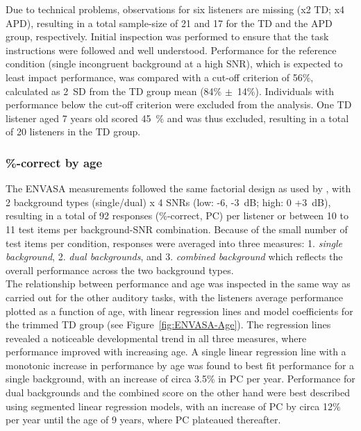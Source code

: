 \documentclass[a4paper, twoside]{templates/ociamthesis}
\begin{document}
Due to technical problems, observations for six listeners are missing (x2 TD; x4 APD), resulting in a total sample-size of 21 and 17 for the TD and the APD group, respectively. Initial inspection was performed to ensure that the task instructions were followed and well understood. Performance for the reference condition (single incongruent background at a high SNR), which is expected to least impact performance, was compared with a cut-off criterion of 56\%, calculated as 2~SD from the TD group mean (84\% \(\pm\)~14\%). Individuals with performance below the cut-off criterion were excluded from the analysis. One TD listener aged 7 years old scored 45~\% and was thus excluded, resulting in a total of 20 listeners in the TD group.

\hypertarget{correct-by-age}{%
\subsubsection*{\%-correct by age}\label{correct-by-age}}

The ENVASA measurements followed the same factorial design as used by \textcite{Leech2009}, with 2 background types (single/dual) x 4 SNRs (low: -6, -3~dB; high: 0 +3~dB), resulting in a total of 92 responses (\%-correct, PC) per listener or between 10 to 11 test items per background-SNR combination. Because of the small number of test items per condition, responses were averaged into three measures: 1. \emph{single background}, 2. \emph{dual backgrounds}, and 3. \emph{combined background} which reflects the overall performance across the two background types.\\

The relationship between performance and age was inspected in the same way as carried out for the other auditory tasks, with the listeners average performance plotted as a function of age, with linear regression lines and model coefficients for the trimmed TD group (see Figure~\ref{fig:ENVASA-Age}). The regression lines revealed a noticeable developmental trend in all three measures, where performance improved with increasing age. A single linear regression line with a monotonic increase in performance by age was found to best fit performance for a single background, with an increase of circa 3.5\% in PC per year. Performance for dual backgrounds and the combined score on the other hand were best described using segmented linear regression models, with an increase of PC by circa 12\% per year until the age of 9 years, where PC plateaued thereafter.\\
\end{document}
